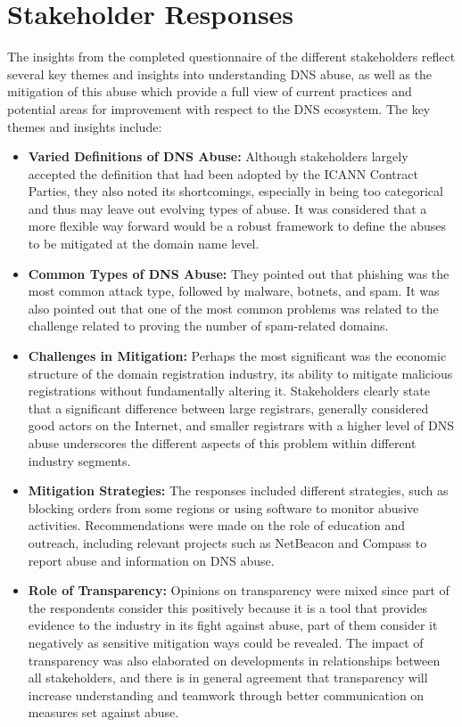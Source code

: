 \section{Stakeholder Responses} 

The insights from the completed questionnaire of the different stakeholders reflect several key themes and insights into understanding DNS abuse, as well as the mitigation of this abuse which provide a full view of current practices and potential areas for improvement with respect to the DNS ecosystem. The key themes and insights include:



\begin{itemize}
  \item \textbf{Varied Definitions of DNS Abuse:} Although stakeholders largely accepted the definition that had been adopted by the ICANN Contract Parties, they also noted its shortcomings, especially in being too categorical and thus may leave out evolving types of abuse. It was considered that a more flexible way forward would be a robust framework to define the abuses to be mitigated at the domain name level.
  
  \item \textbf{Common Types of DNS Abuse:} They pointed out that phishing was the most common attack type, followed by malware, botnets, and spam. It was also pointed out that one of the most common problems was related to the challenge related to proving the number of spam-related domains.
  
  \item \textbf{Challenges in Mitigation:} Perhaps the most significant was the economic structure of the domain registration industry, its ability to mitigate malicious registrations without fundamentally altering it. Stakeholders clearly state that a significant difference between large registrars, generally considered good actors on the Internet, and smaller registrars with a higher level of DNS abuse underscores the different aspects of this problem within different industry segments.
  
  \item \textbf{Mitigation Strategies:} The responses included different strategies, such as blocking orders from some regions or using software to monitor abusive activities. Recommendations were made on the role of education and outreach, including relevant projects such as NetBeacon and Compass to report abuse and information on DNS abuse.
  
  \item \textbf{Role of Transparency:} Opinions on transparency were mixed since part of the respondents consider this positively because it is a tool that provides evidence to the industry in its fight against abuse, part of them consider it negatively as sensitive mitigation ways could be revealed. The impact of transparency was also elaborated on developments in relationships between all stakeholders, and there is in general agreement that transparency will increase understanding and teamwork through better communication on measures set against abuse.
  
\end{itemize}

